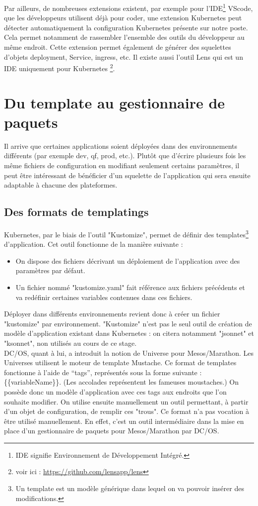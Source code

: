\documentclass[11pt,fleqn]{book} %
\begin{document}
Par ailleurs, de nombreuses extensions existent, par exemple pour l'IDE\footnote{IDE signifie Environnement de Développement Intégré.} VScode, que les développeurs utilisent déjà pour coder, une extension Kubernetes peut détecter automatiquement la configuration Kubernetes présente sur notre poste. Cela permet notamment de rassembler l'ensemble des outils du développeur au même endroit. Cette extension permet également de générer des squelettes d'objets deployment, Service, ingress, etc. Il existe aussi l'outil Lens qui est un IDE uniquement pour Kubernetes \footnote{voir ici : \url{https://github.com/lensapp/lens}}.

\section{Du template au gestionnaire de paquets}
Il arrive que certaines applications soient déployées dans des environnements différents (par exemple dev, qf, prod, etc.). Plutôt que d'écrire plusieurs fois les même fichiers de configuration en modifiant seulement certains paramètres, il peut être intéressant de bénéficier d'un squelette de l'application qui sera ensuite adaptable à chacune des plateformes.
\subsection{Des formats de templatings}
Kubernetes, par le biais de l'outil "Kustomize", permet de définir des templates\footnote{Un template est un modèle générique dans lequel on va pouvoir insérer des modifications.} d'application. Cet outil fonctionne de la manière suivante :
\begin{itemize}
    \item On dispose des fichiers décrivant un déploiement de l'application avec des paramètres par défaut.
    \item Un fichier nommé "kustomize.yaml" fait référence aux fichiers précédents et va redéfinir certaines variables contenues dans ces fichiers.
\end{itemize}
Déployer dans différents environnements revient donc à créer un fichier "kustomize" par environnement. "Kustomize" n'est pas le seul outil de création de modèle d'application existant dans Kubernetes : on citera notamment "jsonnet" et "ksonnet", non utilisés au cours de ce stage.\\ 

DC/OS, quant à lui, a introduit la notion de Universe pour Mesos/Marathon. Les Universes utilisent le moteur de template Mustache. 
Ce format de templates fonctionne à l’aide de “tags”, représentés sous la forme suivante : \{\{variableName\}\}. (Les accolades représentent les fameuses moustaches.) On possède donc un modèle d'application avec ces tags aux endroits que l'on souhaite modifier. On utilise ensuite manuellement un outil permettant, à partir d'un objet de configuration, de remplir ces "trous". Ce format n'a pas vocation à être utilisé manuellement. En effet, c'est un outil intermédiaire dans la mise en place d'un gestionnaire de paquets pour Mesos/Marathon par DC/OS.
\end{document}
